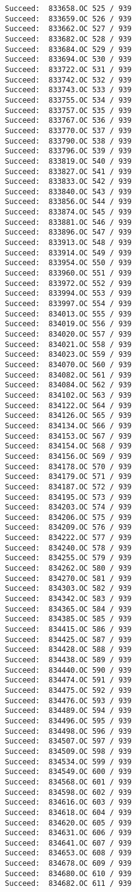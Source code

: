 \documentclass[11pt]{article}
\begin{document}
\begin{verbatim}
Succeed:  833658.OC 525 / 939
Succeed:  833659.OC 526 / 939
Succeed:  833662.OC 527 / 939
Succeed:  833682.OC 528 / 939
Succeed:  833684.OC 529 / 939
Succeed:  833694.OC 530 / 939
Succeed:  833722.OC 531 / 939
Succeed:  833742.OC 532 / 939
Succeed:  833743.OC 533 / 939
Succeed:  833755.OC 534 / 939
Succeed:  833757.OC 535 / 939
Succeed:  833767.OC 536 / 939
Succeed:  833770.OC 537 / 939
Succeed:  833790.OC 538 / 939
Succeed:  833796.OC 539 / 939
Succeed:  833819.OC 540 / 939
Succeed:  833827.OC 541 / 939
Succeed:  833833.OC 542 / 939
Succeed:  833840.OC 543 / 939
Succeed:  833856.OC 544 / 939
Succeed:  833874.OC 545 / 939
Succeed:  833881.OC 546 / 939
Succeed:  833896.OC 547 / 939
Succeed:  833913.OC 548 / 939
Succeed:  833914.OC 549 / 939
Succeed:  833954.OC 550 / 939
Succeed:  833960.OC 551 / 939
Succeed:  833972.OC 552 / 939
Succeed:  833994.OC 553 / 939
Succeed:  833997.OC 554 / 939
Succeed:  834013.OC 555 / 939
Succeed:  834019.OC 556 / 939
Succeed:  834020.OC 557 / 939
Succeed:  834021.OC 558 / 939
Succeed:  834023.OC 559 / 939
Succeed:  834070.OC 560 / 939
Succeed:  834082.OC 561 / 939
Succeed:  834084.OC 562 / 939
Succeed:  834102.OC 563 / 939
Succeed:  834122.OC 564 / 939
Succeed:  834126.OC 565 / 939
Succeed:  834134.OC 566 / 939
Succeed:  834153.OC 567 / 939
Succeed:  834154.OC 568 / 939
Succeed:  834156.OC 569 / 939
Succeed:  834178.OC 570 / 939
Succeed:  834179.OC 571 / 939
Succeed:  834187.OC 572 / 939
Succeed:  834195.OC 573 / 939
Succeed:  834203.OC 574 / 939
Succeed:  834206.OC 575 / 939
Succeed:  834209.OC 576 / 939
Succeed:  834222.OC 577 / 939
Succeed:  834240.OC 578 / 939
Succeed:  834255.OC 579 / 939
Succeed:  834262.OC 580 / 939
Succeed:  834270.OC 581 / 939
Succeed:  834303.OC 582 / 939
Succeed:  834342.OC 583 / 939
Succeed:  834365.OC 584 / 939
Succeed:  834385.OC 585 / 939
Succeed:  834415.OC 586 / 939
Succeed:  834425.OC 587 / 939
Succeed:  834428.OC 588 / 939
Succeed:  834438.OC 589 / 939
Succeed:  834440.OC 590 / 939
Succeed:  834474.OC 591 / 939
Succeed:  834475.OC 592 / 939
Succeed:  834476.OC 593 / 939
Succeed:  834489.OC 594 / 939
Succeed:  834496.OC 595 / 939
Succeed:  834498.OC 596 / 939
Succeed:  834507.OC 597 / 939
Succeed:  834509.OC 598 / 939
Succeed:  834534.OC 599 / 939
Succeed:  834549.OC 600 / 939
Succeed:  834568.OC 601 / 939
Succeed:  834598.OC 602 / 939
Succeed:  834616.OC 603 / 939
Succeed:  834618.OC 604 / 939
Succeed:  834620.OC 605 / 939
Succeed:  834631.OC 606 / 939
Succeed:  834641.OC 607 / 939
Succeed:  834653.OC 608 / 939
Succeed:  834678.OC 609 / 939
Succeed:  834680.OC 610 / 939
Succeed:  834682.OC 611 / 939

\end{verbatim}
\end{document}
